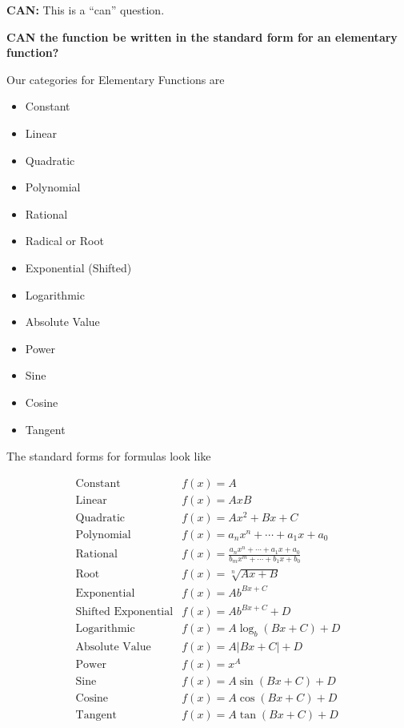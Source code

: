 \documentclass{ximera}
\begin{document}
\textbf{\textcolor{purple!85!blue}{CAN:}}   This is a ``can'' question. \\

\begin{center}
\textbf{\textcolor{red!80!black}{CAN the function be written in the standard form for an elementary function?}}

\end{center}



Our categories for Elementary Functions are

\begin{itemize}
    \item Constant
    \item Linear
    \item Quadratic
    \item Polynomial
    \item Rational
    \item Radical or Root
    \item Exponential (Shifted)
    \item Logarithmic
    \item Absolute Value
    \item Power
    \item Sine
    \item Cosine
    \item Tangent
\end{itemize} 





The standard forms for formulas look like



\[
\begin{array}{ll}
\text{Constant}  & f(x) = A  \\
\text{Linear}  & f(x) = A x B  \\
\text{Quadratic}  & f(x) = A x^2 + B x + C  \\
\text{Polynomial}  & f(x) = a_n x^n + \cdots + a_1 x + a_0  \\
\text{Rational}  & f(x) = \frac{a_n x^n + \cdots + a_1 x + a_0}{b_m x^m + \cdots + b_1 x + b_0}  \\
\text{Root}  & f(x) = \sqrt[n]{A x + B}  \\
\text{Exponential}  & f(x) = A b^{B x + C}  \\
\text{Shifted Exponential}  & f(x) = A b^{B x + C} + D  \\
\text{Logarithmic}  & f(x) = A \log_b(B x + C) + D  \\
\text{Absolute Value}  & f(x) = A |B x + C| + D \\
\text{Power}  & f(x) = x^A  \\
\text{Sine}  & f(x) = A \sin(B x + C) + D  \\
\text{Cosine}  & f(x) = A \cos(B x + C) + D  \\
\text{Tangent}  & f(x) = A \tan(B x + C) + D  
\end{array}
\]
\end{document}
